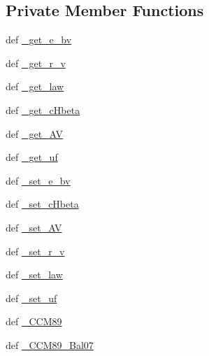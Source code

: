 \subsection*{Private Member Functions}
\begin{DoxyCompactItemize}
\item 
def \hyperlink{classpyneb_1_1extinction_1_1red__corr_1_1_red_corr_ac33805bfaabab8f029f01b3dcdbffa4c}{\-\_\-get\-\_\-e\-\_\-bv}
\item 
def \hyperlink{classpyneb_1_1extinction_1_1red__corr_1_1_red_corr_a19b51d443c271dfbef23e853a2c0cacf}{\-\_\-get\-\_\-r\-\_\-v}
\item 
def \hyperlink{classpyneb_1_1extinction_1_1red__corr_1_1_red_corr_ae23e08c510a8de32425ec439023c00dc}{\-\_\-get\-\_\-law}
\item 
def \hyperlink{classpyneb_1_1extinction_1_1red__corr_1_1_red_corr_ab4f5d5e32fb4be72e6cd703cd0dfb0df}{\-\_\-get\-\_\-c\-Hbeta}
\item 
def \hyperlink{classpyneb_1_1extinction_1_1red__corr_1_1_red_corr_a68f3c957fd80d17a976733494ec92c79}{\-\_\-get\-\_\-\-A\-V}
\item 
def \hyperlink{classpyneb_1_1extinction_1_1red__corr_1_1_red_corr_ae917e42eeee77f8070c8c9b8cc184a37}{\-\_\-get\-\_\-uf}
\item 
def \hyperlink{classpyneb_1_1extinction_1_1red__corr_1_1_red_corr_a435874b44a40876df8f828173171028c}{\-\_\-set\-\_\-e\-\_\-bv}
\item 
def \hyperlink{classpyneb_1_1extinction_1_1red__corr_1_1_red_corr_ab6f42b2fb11938d407a960799784d5aa}{\-\_\-set\-\_\-c\-Hbeta}
\item 
def \hyperlink{classpyneb_1_1extinction_1_1red__corr_1_1_red_corr_a98a035be4770e0d690490821cd514a74}{\-\_\-set\-\_\-\-A\-V}
\item 
def \hyperlink{classpyneb_1_1extinction_1_1red__corr_1_1_red_corr_a9802a083db9982d308b4a78388401b94}{\-\_\-set\-\_\-r\-\_\-v}
\item 
def \hyperlink{classpyneb_1_1extinction_1_1red__corr_1_1_red_corr_aa205c5f56725816af787bdea7b8aa29c}{\-\_\-set\-\_\-law}
\item 
def \hyperlink{classpyneb_1_1extinction_1_1red__corr_1_1_red_corr_aa2b2bda77fced31b3fb64de5731a3d61}{\-\_\-set\-\_\-uf}
\item 
def \hyperlink{classpyneb_1_1extinction_1_1red__corr_1_1_red_corr_a0e1f547dbed4401b9c3d34658db9aaf7}{\-\_\-\-C\-C\-M89}
\item 
def \hyperlink{classpyneb_1_1extinction_1_1red__corr_1_1_red_corr_a5422d3b4c568033cc97ada0b73670aa9}{\-\_\-\-C\-C\-M89\-\_\-\-Bal07}

\end{DoxyCompactItemize}
